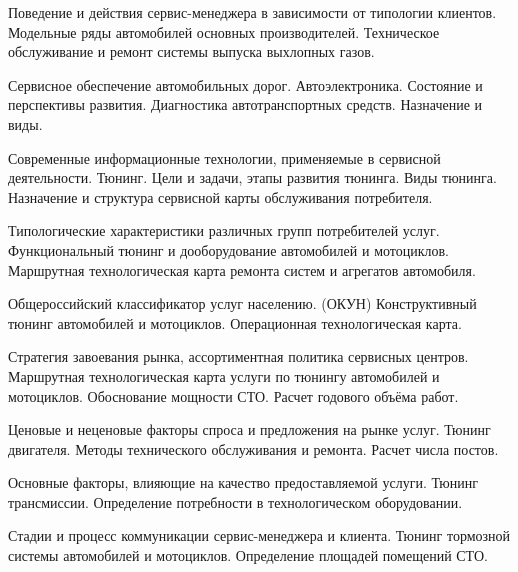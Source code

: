 \documentclass[
	11pt,
	a4paper,
	]
	{article}
\begin{document}
\bigskip

\noindent{} 
	{
		Поведение и действия сервис-менеджера в зависимости от типологии клиентов.
	}{
		Модельные ряды автомобилей основных производителей.
	}{
		Техническое обслуживание и ремонт системы выпуска выхлопных газов.
	}

\bigskip

\noindent{} 
	{
		Сервисное обеспечение автомобильных дорог.
	}{
		Автоэлектроника. Состояние и перспективы развития.
	}{
		Диагностика автотранспортных средств. Назначение и виды.
	}

\bigskip

\noindent{} 
	{
		Современные информационные технологии, применяемые в сервисной деятельности.
	}{
		Тюнинг. Цели и задачи, этапы развития тюнинга. Виды тюнинга.
	}{
		Назначение и структура сервисной карты обслуживания потребителя.
	}

\bigskip

\noindent{} 
	{
		Типологические характеристики различных групп потребителей услуг.
	}{
		Функциональный тюнинг и дооборудование автомобилей и мотоциклов.
	}{
		Маршрутная технологическая карта ремонта систем и агрегатов автомобиля.
	}

\bigskip

\noindent{} 
	{
		Общероссийский классификатор услуг населению. (ОКУН)
	}{
		Конструктивный тюнинг автомобилей и мотоциклов.
	}{
		Операционная технологическая карта.
	}

\bigskip

\noindent{} 
	{
		Стратегия завоевания рынка, ассортиментная политика сервисных центров.
	}{
		Маршрутная технологическая карта услуги по тюнингу автомобилей и мотоциклов.
	}{
		Обоснование мощности СТО. Расчет годового объёма работ.
	}

\bigskip

\noindent{} 
	{
		Ценовые и неценовые факторы спроса и предложения на рынке услуг.
	}{
		Тюнинг двигателя.
	}{
		Методы технического обслуживания и ремонта. Расчет числа постов.
	}

\bigskip

\noindent{} 
	{
		Основные факторы, влияющие на качество предоставляемой услуги.
	}{
		Тюнинг трансмиссии.
	}{
		Определение потребности в технологическом оборудовании.
	}

\bigskip

\noindent{} 
	{
		Стадии и процесс коммуникации сервис-менеджера и клиента.
	}{
		Тюнинг тормозной системы автомобилей и мотоциклов.
	}{
		Определение площадей помещений СТО.
	}
\end{document}

